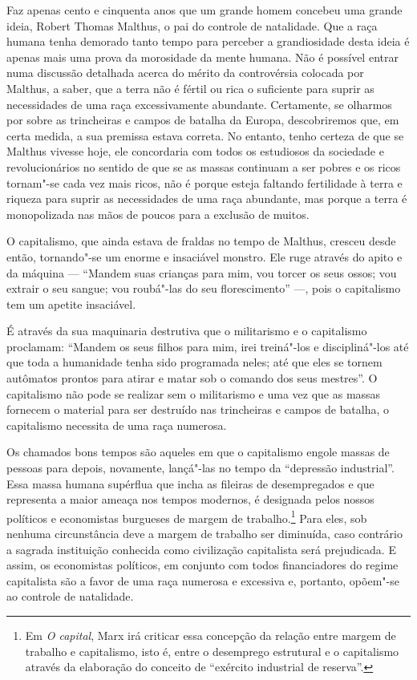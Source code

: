 Faz apenas cento e cinquenta anos que um grande homem concebeu uma
grande ideia, Robert Thomas Malthus, o pai do controle de natalidade.
Que a raça humana tenha demorado tanto tempo para perceber a
grandiosidade desta ideia é apenas mais uma prova da morosidade da mente
humana. Não é possível entrar numa discussão detalhada acerca do mérito
da controvérsia colocada por Malthus, a saber, que a terra não é fértil
ou rica o suficiente para suprir as necessidades de uma raça
excessivamente abundante. Certamente, se olharmos por sobre as
trincheiras e campos de batalha da Europa, descobriremos que, em
certa medida, a sua premissa estava correta. No entanto, tenho certeza
de que se Malthus vivesse hoje, ele concordaria com todos os estudiosos
da sociedade e revolucionários no sentido de que se as massas continuam
a ser pobres e os ricos tornam"-se cada vez mais ricos, não é porque
esteja faltando fertilidade à terra e riqueza para suprir as
necessidades de uma raça abundante, mas porque a terra é monopolizada
nas mãos de poucos para a exclusão de muitos.

O capitalismo, que ainda estava de fraldas no tempo de Malthus, cresceu
desde então, tornando"-se um enorme e insaciável monstro. Ele ruge
através do apito e da máquina --- ``Mandem suas crianças para mim, vou
torcer os seus ossos; vou extrair o seu sangue; vou roubá"-las do seu
florescimento'' ---, pois o capitalismo tem um apetite insaciável.

É através da sua maquinaria destrutiva que o militarismo e o capitalismo
proclamam: ``Mandem os seus filhos para mim, irei treiná"-los e
discipliná"-los até que toda a humanidade tenha sido programada neles;
até que eles se tornem autômatos prontos para atirar e matar sob o
comando dos seus mestres''. O capitalismo não pode se realizar sem o
militarismo e uma vez que as massas fornecem o material para ser destruído
nas trincheiras e campos de batalha, o capitalismo necessita de uma raça
numerosa.

Os chamados bons tempos são aqueles em que o capitalismo engole massas
de pessoas para depois, novamente, lançá"-las no tempo da ``depressão
industrial''. Essa massa humana supérflua que incha as fileiras de
desempregados e que representa a maior ameaça nos tempos modernos, é
designada pelos nossos políticos e economistas burgueses de margem de
trabalho.\footnote{Em \textit{O capital}, Marx irá criticar essa concepção da relação entre margem de trabalho e capitalismo, isto é, entre o desemprego estrutural e o capitalismo através da elaboração do conceito de ``exército industrial de reserva''.} Para eles, sob nenhuma circunstância deve a margem de trabalho
ser diminuída, caso contrário a sagrada instituição conhecida como
civilização capitalista será prejudicada. E assim, os economistas
políticos, em conjunto com todos financiadores do regime capitalista são
a favor de uma raça numerosa e excessiva e, portanto, opõem"-se ao
controle de natalidade.

